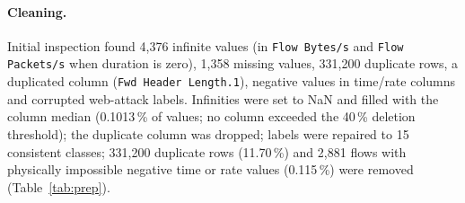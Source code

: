 \documentclass[11pt,a4paper]{article}
\newcommand{\feat}[1]{\texttt{#1}}
\begin{document}
\begin{table}[tbp]
\centering
\caption{Class distribution: raw, natural training split (80\,\%) and training set after capped resampling.}
\label{tab:classes}
\scriptsize
{}
\end{table}

\paragraph{Cleaning.} Initial inspection found 4{,}376 infinite values (in \feat{Flow Bytes/s} and \feat{Flow Packets/s} when duration is zero), 1{,}358 missing values, 331{,}200 duplicate rows, a duplicated column (\feat{Fwd Header Length.1}), negative values in time/rate columns and corrupted web-attack labels. Infinities were set to NaN and filled with the column median (0.1013\,\% of values; no column exceeded the 40\,\% deletion threshold); the duplicate column was dropped; labels were repaired to 15 consistent classes; 331{,}200 duplicate rows (11.70\,\%) and 2{,}881 flows with physically impossible negative time or rate values (0.115\,\%) were removed (Table~\ref{tab:prep}).
\end{document}
